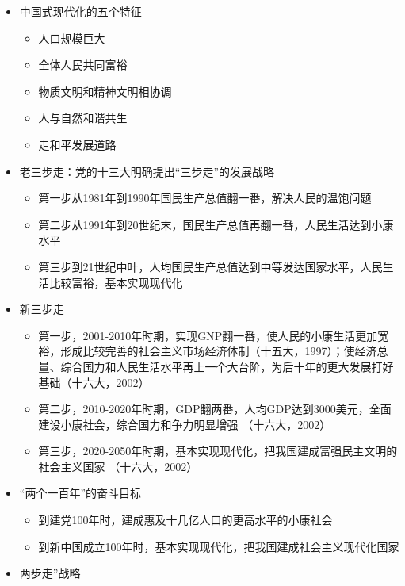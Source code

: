 \documentclass[
]{ctexart}
\providecommand{\tightlist}{%
  \setlength{\itemsep}{0pt}\setlength{\parskip}{0pt}}
\begin{document}
\begin{itemize}
\tightlist
\item
  中国式现代化的五个特征

  \begin{itemize}
  \tightlist
  \item
    人口规模巨大
  \item
    全体人民共同富裕
  \item
    物质文明和精神文明相协调
  \item
    人与自然和谐共生
  \item
    走和平发展道路
  \end{itemize}
\item
  老三步走：党的十三大明确提出``三步走''的发展战略

  \begin{itemize}
  \tightlist
  \item
    第一步从1981年到1990年国民生产总值翻一番，解决人民的温饱问题
  \item
    第二步从1991年到20世纪末，国民生产总值再翻一番，人民生活达到小康水平
  \item
    第三步到21世纪中叶，人均国民生产总值达到中等发达国家水平，人民生活比较富裕，基本实现现代化
  \end{itemize}
\item
  新三步走

  \begin{itemize}
  \tightlist
  \item
    第一步，2001-2010年时期，实现GNP翻一番，使人民的小康生活更加宽裕，形成比较完善的社会主义市场经济体制（十五大，1997）；使经济总量、综合国力和人民生活水平再上一个大台阶，为后十年的更大发展打好基础（十六大，2002）
  \item
    第二步，2010-2020年时期，GDP翻两番，人均GDP达到3000美元，全面建设小康社会，综合国力和争力明显增强
    （十六大，2002）
  \item
    第三步，2020-2050年时期，基本实现现代化，把我国建成富强民主文明的社会主义国家
    （十六大，2002）
  \end{itemize}
\item
  ``两个一百年''的奋斗目标

  \begin{itemize}
  \tightlist
  \item
    到建党100年时，建成惠及十几亿人口的更高水平的小康社会
  \item
    到新中国成立100年时，基本实现现代化，把我国建成社会主义现代化国家
  \end{itemize}
\item
  两步走''战略


\end{itemize}
\end{document}
